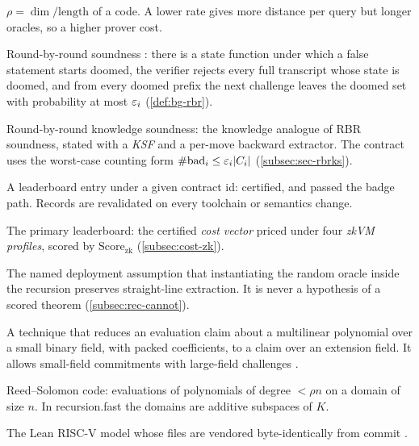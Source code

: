 \begin{description}[leftmargin=0pt,itemsep=2pt,parsep=0pt,font=\normalfont\bfseries]
\item[Rate.] $\rho=\dim/\text{length}$ of a code. A lower rate gives more distance per query but
  longer oracles, so a higher prover cost.

\item[RBR soundness.] Round-by-round soundness \cite{CCHLRRW19}: there is a state function under
  which a false statement starts doomed, the verifier rejects every full transcript whose state is
  doomed, and from every doomed prefix the next challenge leaves the doomed set with probability
  at most $\varepsilon_i$
  (\cref{def:bg-rbr}).

\item[RBR-KS.] Round-by-round knowledge soundness: the knowledge analogue of RBR soundness, stated
  with a \emph{KSF} and a per-move backward extractor. The contract uses the worst-case counting
  form $\#\mathrm{bad}_i\le\varepsilon_i|C_i|$ \cite{BCFW25-WARP} (\cref{subsec:sec-rbrks}).

\item[Record.] A leaderboard entry under a given contract id: certified, and passed the badge
  path. Records are revalidated on every toolchain or semantics change.

\item[Recursion board.] The primary leaderboard: the certified \emph{cost vector} priced under four
  \emph{zkVM profiles}, scored by $\mathrm{Score}_{\mathrm{zk}}$ (\cref{subsec:cost-zk}).

\item[RecursionHeuristic.] The named deployment assumption that instantiating the random oracle
  inside the recursion preserves straight-line extraction. It is never a hypothesis of a scored
  theorem (\cref{subsec:rec-cannot}).

\item[Ring switching.] A technique that reduces an evaluation claim about a multilinear polynomial
  over a small binary field, with packed coefficients, to a claim over an extension field. It
  allows small-field commitments with large-field challenges \cite{DP24-FRIBinius}.

\item[RS code.] Reed--Solomon code: evaluations of polynomials of degree $<\rho n$ on a domain of
  size $n$. In recursion.fast the domains are additive subspaces of $K$.

\item[riscv-zkvm.] The Lean RISC-V model whose  files are vendored byte-identically
  from commit  \cite{riscvzkvm2026}.


\end{description}
